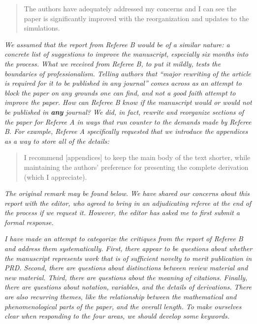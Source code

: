 \documentclass[12pt]{article}
\begin{document}
\begin{quote}
The authors have adequately addressed my concerns and I can see the paper is significantly improved with the reorganization and updates to the simulations.
\end{quote}

\textit{We assumed that the report from Referee B would be of a similar nature: a concrete list of suggestions to improve the manuscript, especially six months into the process.  What we received from Referee B, to put it mildly, tests the boundaries of professionalism.  Telling authors that ``major rewriting of the article is required for it to be published in any journal'' comes across as an attempt to block the paper on any grounds one can find, and not a good faith attempt to improve the paper.  How can Referee B know if the manuscript would or would not be published in \textbf{any} journal?  We did, in fact, rewrite and reorganize sections of the paper for Referee A in ways that run counter to the demands made by Referee B.  For example, Referee A specifically requested that we introduce the appendices as a way to store all of the details:}

\begin{quote}
I recommend [appendices] to keep the main body of the text shorter, while maintaining the authors’ preference for presenting the complete derivation (which I appreciate).
\end{quote}

\textit{The original remark may be found below.  We have shared our concerns about this report with the editor, who agreed to bring in an adjudicating referee at the end of the process if we request it.  However, the editor has asked me to first submit a formal response.}

\textit{I have made an attempt to categorize the critiques from the report of Referee B and address them systematically.  First, there appear to be questions about whether the manuscript represents work that is of sufficient novelty to merit publication in PRD.  Second, there are questions about distinctions between review material and new material.  Third, there are questions about the meaning of citations.  Finally, there are questions about notation, variables, and the details of derivations.  There are also recurring themes, like the relationship between the mathematical and phenomenological parts of the paper, and the overall length.  To make ourselves clear when responding to the four areas, we should develop some keywords.}
\end{document}

